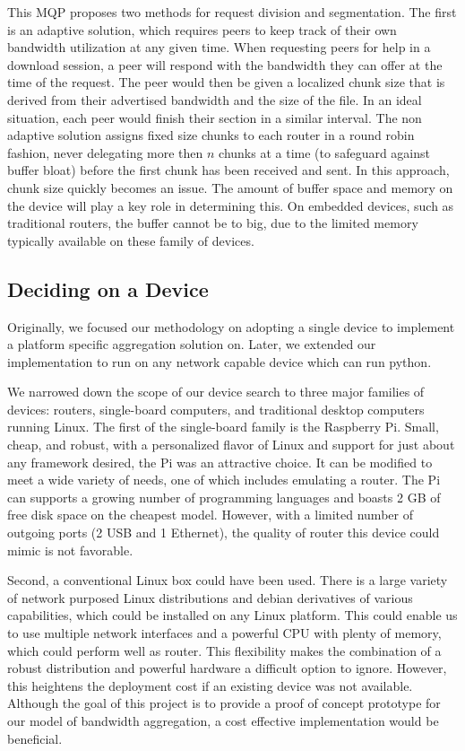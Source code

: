 \documentclass[12pt]{article}
\begin{document}
			This MQP proposes two methods for request division and segmentation. The first is an adaptive solution, which requires peers to keep track of their own bandwidth utilization at any given time. When requesting peers for help in a download session, a peer will respond with the bandwidth they can offer at the time of the request. The peer would then be given a localized chunk size that is derived from their advertised bandwidth and the size of the file. In an ideal situation, each peer would finish their section in a similar interval. The non adaptive solution assigns fixed size chunks to each router in a round robin fashion, never delegating more then $n$ chunks at a time (to safeguard against buffer bloat) before the first chunk has been received and sent. In this approach, chunk size quickly becomes an issue. The amount of buffer space and memory on the device will play a key role in determining this. On embedded devices, such as traditional routers, the buffer cannot be to big, due to the limited memory typically available on these family of devices.


	\subsection{Deciding on a Device}
		
		Originally, we focused our methodology on adopting a single device to implement a platform specific aggregation solution on. Later, we extended our implementation to run on any network capable device which can run python.

		We narrowed down the scope of our device search to three major families of devices: routers, single-board computers, and traditional desktop computers running  Linux. The first of the single-board family is the Raspberry Pi. Small, cheap, and robust, with a personalized flavor of Linux and support for just about any framework desired, the Pi was an attractive choice. It can be modified to meet a wide variety of needs, one of which includes emulating a router. The Pi can supports a growing number of programming languages and boasts 2 GB of free disk space on the cheapest model. However, with a limited number of outgoing ports (2 USB and 1 Ethernet), the quality of router this device could mimic is not favorable.

		Second, a conventional Linux box could have been used. There is a large variety of network purposed Linux distributions and debian derivatives of various capabilities, which could be installed on any Linux platform. This could enable us to use multiple network interfaces and a powerful CPU with plenty of memory, which could perform well as router. This flexibility makes the combination of a robust distribution and powerful hardware a difficult option to ignore. However, this heightens the deployment cost if an existing device was not available. Although the goal of this project is to provide a proof of concept prototype for our model of bandwidth aggregation, a cost effective implementation would be beneficial. 
\end{document}
